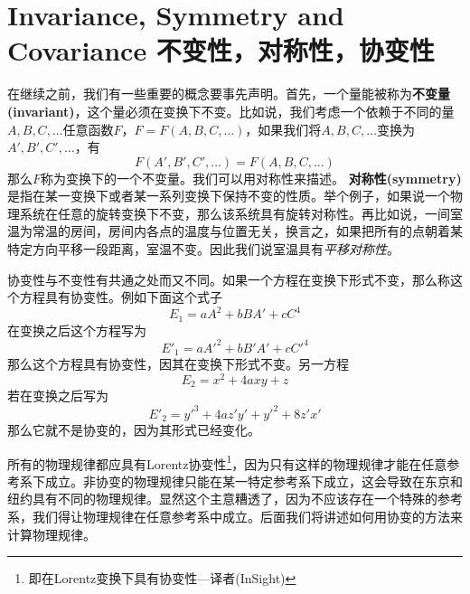 \section[不变性，对称性，协变性]{Invariance, Symmetry and Covariance 不变性，对称性，协变性}
在继续之前，我们有一些重要的概念要事先声明。首先，一个量能被称为{\bf{不变量(invariant)}}，这个量必须在变换下不变。比如说，我们考虑一个依赖于不同的量$A,B,C,\dots$任意函数$ F$，$F=F(A,B,C,\dots)$，如果我们将$A,B,C,\dots$变换为$A',B',C',\dots$，有
\begin{equation}\label{equ2.37}
  F(A',B',C',\dots)=F(A,B,C,\dots)
\end{equation}
那么$F$称为变换下的一个不变量。我们可以用对称性来描述。
{\bf{对称性(symmetry)}}是指在某一变换下或者某一系列变换下保持不变的性质。举个例子，如果说一个物理系统在任意的旋转变换下不变，那么该系统具有旋转对称性。再比如说，一间室温为常温的房间，房间内各点的温度与位置无关，换言之，如果把所有的点朝着某特定方向平移一段距离，室温不变。因此我们说室温具有{\it{平移对称性}}。

协变性与不变性有共通之处而又不同。如果一个方程在变换下形式不变，那么称这个方程具有协变性。例如下面这个式子
\[
E_1=a A^2+bBA'+cC^4
\]
在变换之后这个方程写为
\[
E'_1=a A'^2+bB'A'+cC'^4
\]
那么这个方程具有协变性，因其在变换下形式不变。另一方程
\[
E_2=x^2+4axy+z
\]
若在变换之后写为
\[
E'_2=y'^3+4az'y'+y'^2+8z'x'
\]
那么它就不是协变的，因为其形式已经变化。

所有的物理规律都应具有Lorentz协变性\footnote{即在Lorentz变换下具有协变性---译者(InSight)}，因为只有这样的物理规律才能在任意参考系下成立。非协变的物理规律只能在某一特定参考系下成立，这会导致在东京和纽约具有不同的物理规律。显然这个主意糟透了，因为不应该存在一个特殊的参考系，我们得让物理规律在任意参考系中成立。后面我们将讲述如何用协变的方法来计算物理规律。

